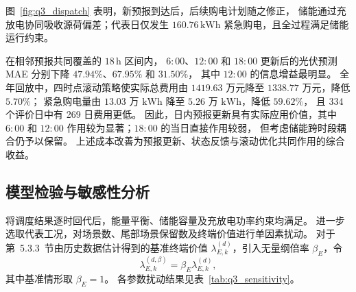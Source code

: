 \documentclass[zihao=-4,a4paper,UTF8,fontset=none]{ctexart}
\begin{document}
图~\ref{fig:q3_dispatch} 表明，新预报到达后，后续购电计划随之修正，
储能通过充放电协同吸收源荷偏差；代表日仅发生
$160.76\,\mathrm{kWh}$ 紧急购电，且全过程满足储能运行约束。

在相邻预报共同覆盖的 $18\,\mathrm h$ 区间内，
$6{:}00$、$12{:}00$ 和 $18{:}00$ 更新后的光伏预测 MAE
分别下降 $47.94\%$、$67.95\%$ 和 $31.50\%$，
其中 $12{:}00$ 的信息增益最明显。
全年回放中，四时点滚动策略使实际总费用由
$1419.63$ 万元降至 $1338.77$ 万元，降低 $5.70\%$；
紧急购电量由 $13.03$ 万 $\mathrm{kWh}$ 降至
$5.26$ 万 $\mathrm{kWh}$，降低 $59.62\%$，
且 334 个评价日中有 269 日费用更低。
因此，日内预报更新具有实际应用价值，其中 $6{:}00$ 和 $12{:}00$
作用较为显著；$18{:}00$ 的当日直接作用较弱，
但考虑储能跨时段耦合仍予以保留。
上述成本改善为预报更新、状态反馈与滚动优化共同作用的综合收益。


\subsection{模型检验与敏感性分析}

将调度结果逐时回代后，能量平衡、储能容量及充放电功率约束均满足。
进一步选取代表工况，对场景数、尾部场景保留数及终端价值进行单因素扰动。
对于第~5.3.3~节由历史数据估计得到的基准终端价值
$\lambda_{E,k}^{(d)}$，引入无量纲倍率 $\beta_E$，令
\[
    \lambda_{E,k}^{(d,\beta)}
    =
    \beta_E \lambda_{E,k}^{(d)},
\]
其中基准情形取 $\beta_E=1$。
各参数扰动结果见表~\ref{tab:q3_sensitivity}。
\end{document}
